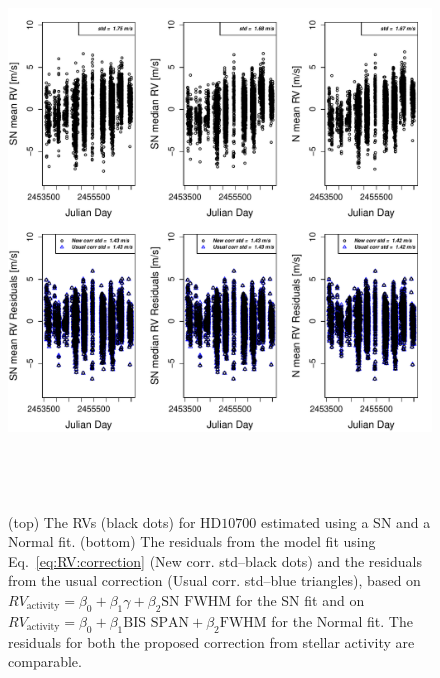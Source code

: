 \documentclass{aa}
\begin{document}
\begin{figure} 
\begin{center}
\includegraphics[height = 6in]{NEW_CORRECTIONHD10700_[3]CorrectionActivity_RadialVelocity_vs_time.pdf} 
   \caption{(top) The RVs (black dots) for $\text{HD}10700$ estimated using a SN and a Normal fit.
 (bottom) The residuals from the model fit using Eq.~\eqref{eq:RV:correction} (New corr. std--black dots) and the residuals from the usual correction (Usual corr. std--blue triangles), based on $RV_{\text{activity}}=\beta_0+\beta_1 \gamma + \beta_2 \text{SN FWHM}$ for the SN fit and on $RV_{\text{activity}}=\beta_0+\beta_1 \text{BIS SPAN} + \beta_2 \text{FWHM}$ for the Normal fit. The residuals for both the proposed correction from stellar activity are comparable.}
   \label{fig:HD10700:correctionRV}
\end{center}
\end{figure}
\end{document}
